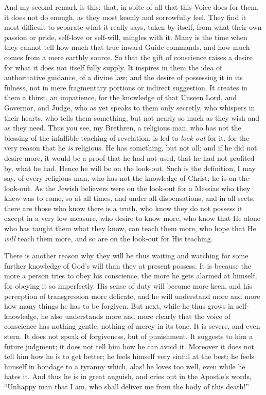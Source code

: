 And my second remark is this: that, in spite of all
that this Voice does for them, it does not do enough, as
they most keenly and sorrowfully feel. They find it most
difficult to separate what it really says, taken by
itself, from what their own passion or pride, self-love
or self-will, mingles with it. Many is the time when they
cannot tell how much that true inward Guide commands, and
how much comes from a mere earthly source. So that the
gift of conscience raises a desire for what it does not
itself fully supply. It inspires in them the idea of
authoritative guidance, of a divine law; and the desire
of possessing it in its fulness, not in mere fragmentary
portions or indirect suggestion. It creates in them a
thirst, an impatience, for the knowledge of that Unseen Lord, and Governor, and Judge, who as yet speaks to them
only secretly, who whispers in their hearts, who tells
them something, but not nearly so much as they wish and
as they need. Thus you see, my Brethren, a religious man,
who has not the blessing of the infallible teaching of
revelation, is led to \emph{look out} for it, for the
very reason that he \emph{is} religious. He has
something, but not all; and if he did not desire more, it
would be a proof that he had not used, that he had not
profited by, what he had. Hence he will be on the
look-out. Such is the definition, I may say, of every
religious man, who has not the knowledge of Christ; he is
on the look-out. As the Jewish believers were on the
look-out for a Messias who they knew was to come, so at
all times, and under all dispensations, and in all sects,
there are those who know there is a truth, who know they
do not possess it except in a very low measure, who
desire to know more, who know that He alone who has
taught them what they know, can teach them more, who hope
that He \emph{will} teach them more, and so are on the
look-out for His teaching.

There is another reason why they will be thus waiting
and watching for some further knowledge of God's will
than they at present possess. It is because the more a
person tries to obey his conscience, the more he gets
alarmed at himself, for obeying it so imperfectly. His
sense of duty will become more keen, and his perception
of transgression more delicate, and he will understand
more and more how many things he has to be forgiven. But
next, while he thus grows in self-knowledge, he also
understands more and more clearly that the voice of
conscience has nothing gentle, nothing of mercy in its
tone. It is severe, and even stern. It does not speak of
forgiveness, but of punishment. It suggests to him a
future judgment; it does not tell him how he can avoid
it. Moreover it does not tell him how he is to get
better; he feels himself very sinful at the best; he
feels himself in bondage to a tyranny which, alas! he
loves too well, even while he hates it. And thus he is in
great anguish, and cries out in the Apostle's words,
``Unhappy man that I am, who shall deliver me from
the body of this death!''

